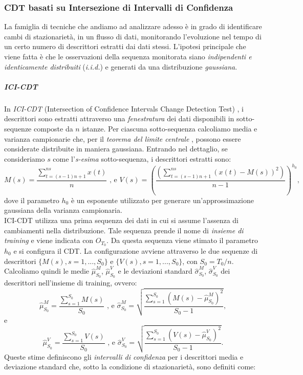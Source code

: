 \subsubsection{CDT basati su Intersezione di Intervalli di Confidenza}
La famiglia di tecniche che andiamo ad analizzare adesso \`e in grado di identificare cambi di stazionariet\`a, in un flusso di dati, monitorando l'evoluzione nel tempo di un certo numero di descrittori estratti dai dati stessi.
L'ipotesi principale che viene fatta \`e che le osservazioni della sequenza monitorata siano \textit{indipendenti e identicamente distribuiti} (\textit{i.i.d.}) e generati da una distribuzione \textit{gaussiana}.
\subparagraph{ICI-CDT}
In \textit{ICI-CDT} (Intersection of Confidence Intervals Change Detection Test) \cite{alippi2011just}, i descrittori sono estratti attraverso una \textit{fenestratura} dei dati disponibili in sotto-sequenze composte da $n$ istanze. Per ciascuna sotto-sequenza calcoliamo media e  varianza campionarie che, per il \textit{teorema del limite centrale} \cite{ross2009introduction}, possono essere considerate distribuite in maniera gaussiana. Entrando nel dettaglio, se consideriamo $s$ come l'\textit{s-esima} sotto-sequenza, i descrittori estratti sono:
\[ M(s)=\frac{\sum\limits_{t=(s-1)n+1}^{ns}x(t)}{n} \text{ , e } V(s)=\left(\frac{\left(\sum\limits_{t=(s-1)n+1}^{ns}(x(t)-M(s))^2\right)}{n-1}\right)^{h_0}, \]
dove il parametro $h_0$ \`e un esponente utilizzato per generare un'approssimazione gaussiana della varianza campionaria.\\
ICI-CDT utilizza una prima sequenza dei dati in cui si assume l'assenza di cambiamenti nella distribuzione. Tale sequenza prende il nome di \textit{insieme di training} e viene indicata con $O_{T_0}$. Da questa sequenza viene stimato il parametro $h_0$ e si configura il CDT. La configurazione avviene attraverso le due sequenze di descrittori $\{M(s), s=1,...,S_0\}$ e $\{V(s), s=1,...,S_0\}$, con $S_0=T_0/n$.\\
Calcoliamo quindi le medie $\hat{\mu}^M_{S_0}$, $\hat{\mu}^V_{S_0}$ e le deviazioni standard $\hat{\sigma}^M_{S_0}$, $\hat{\sigma}^V_{S_0}$ dei descrittori nell'insieme di training, ovvero:
\[ \hat{\mu}^M_{S_0}=\frac{\sum\limits_{s=1}^{S_0}M(s)}{S_0} \text{ , e } \hat{\sigma}^M_{S_0}=\sqrt{\frac{\sum\limits_{s=1}^{S_0}(M(s)-\hat{\mu}^M_{S_0})^2}{S_0-1}}, \]
e
\[ \hat{\mu}^V_{S_0}=\frac{\sum\limits_{s=1}^{S_0}V(s)}{S_0} \text{ , e } \hat{\sigma}^V_{S_0}=\sqrt{\frac{\sum\limits_{s=1}^{S_0}(V(s)-\hat{\mu}^V_{S_0})^2}{S_0-1}}. \]
Queste stime definiscono gli \textit{intervalli di confidenza} per i descrittori media e deviazione standard che, sotto la condizione di stazionariet\`a, sono definiti come:

